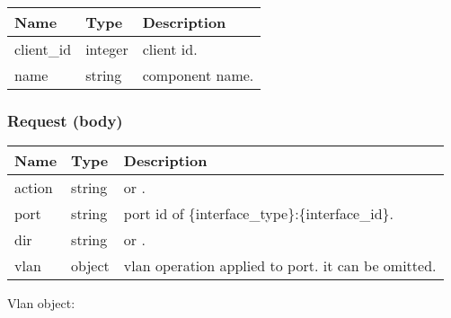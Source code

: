 \documentclass[a4paper,11pt,openany,oneside,english]{sphinxmanual}
\begin{document}
\begin{savenotes}\sphinxattablestart
\centering
{}
\sphinxthecaptionisattop
{}\label{\detokenize{api_ref/spp_vf:id28}}\label{\detokenize{api_ref/spp_vf:table-spp-ctl-spp-vf-comp-port}}
\sphinxaftertopcaption
\begin{tabulary}{\linewidth}[t]{|T|T|T|}
\hline
\sphinxstyletheadfamily 
Name
&\sphinxstyletheadfamily 
Type
&\sphinxstyletheadfamily 
Description
\\
\hline
client\_id
&
integer
&
client id.
\\
\hline
name
&
string
&
component name.
\\
\hline
\end{tabulary}
\par
\sphinxattableend\end{savenotes}


\subsubsection{Request (body)}
\label{\detokenize{api_ref/spp_vf:id10}}

\begin{savenotes}\sphinxattablestart
\centering
{}
\sphinxthecaptionisattop
{}\label{\detokenize{api_ref/spp_vf:id29}}\label{\detokenize{api_ref/spp_vf:table-spp-ctl-spp-vf-comp-port-body}}
\sphinxaftertopcaption
\begin{tabulary}{\linewidth}[t]{|T|T|T|}
\hline
\sphinxstyletheadfamily 
Name
&\sphinxstyletheadfamily 
Type
&\sphinxstyletheadfamily 
Description
\\
\hline
action
&
string
&
 or .
\\
\hline
port
&
string
&
port id of \{interface\_type\}:\{interface\_id\}.
\\
\hline
dir
&
string
&
 or .
\\
\hline
vlan
&
object
&
vlan operation applied to port. it can be omitted.
\\
\hline
\end{tabulary}
\par
\sphinxattableend\end{savenotes}

Vlan object:
\end{document}
